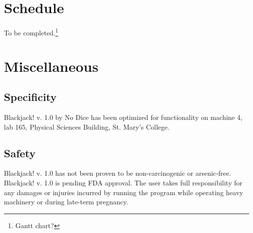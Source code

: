 \documentclass[12pt]{article}
\begin{document}
\section{Schedule}\label{sec:schedule}
To be completed.\footnote{Gantt chart?}

\section{Miscellaneous}
\subsection{Specificity}
Blackjack! v. 1.0 by No Dice has been optimized for functionality on machine 4,
lab 165, Physical Sciences Building, St. Mary’s College.

\subsection{Safety}
Blackjack! v. 1.0 has not been proven to be non-carcinogenic or arsenic-free. 
Blackjack! v. 1.0 is pending FDA approval.  The user takes full responsibility
for any damages or injuries incurred by running the program while operating
heavy machinery or during late-term pregnancy.
\end{document}
